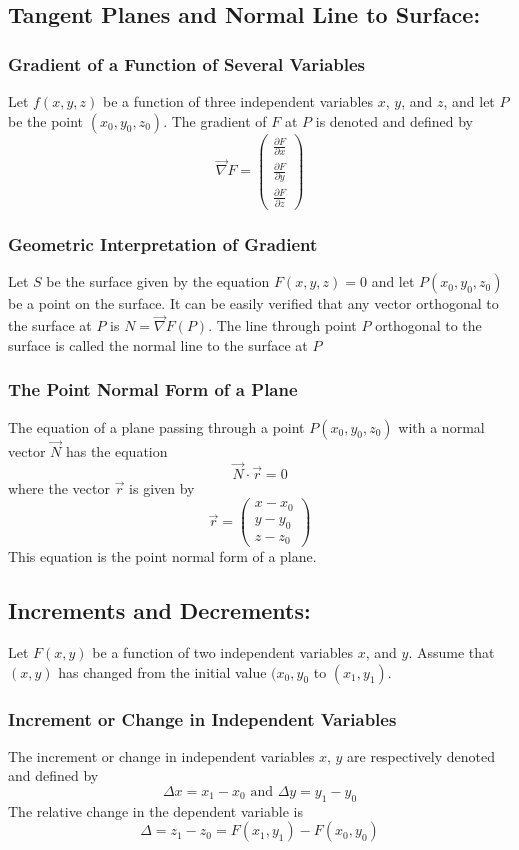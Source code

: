 \documentclass[14pt]{article}
\begin{document}
    \subsection{Tangent Planes and Normal Line to Surface:}
    \subsubsection{Gradient of a Function of Several Variables}
    Let $f(x,y,z)$ be a function of three independent variables $x$, $y$, and $z$, and let $P$ be the point $(x_0, y_0, z_0)$. The gradient of $F$ at $P$ is denoted and defined by
    $$\vec\nabla F=\begin{pmatrix}
        \frac{\partial F}{\partial x}\\
        \frac{\partial F}{\partial y}\\
        \frac{\partial F}{\partial z}
    \end{pmatrix}$$
    \subsubsection{Geometric Interpretation of Gradient}
    Let $S$ be the surface given by the equation $F(x,y,z)=0$ and let $P(x_0, y_0, z_0)$ be a point on the surface. It can be easily verified that any vector orthogonal to the surface at $P$ is $N=\vec \nabla F(P)$. The line through point $P$ orthogonal to the surface is called the normal line to the surface at $P$
    \subsubsection{The Point Normal Form of a Plane}
    The equation of  a plane passing through a point $P(x_0, y_0, z_0)$ with a normal vector $\vec N$ has the equation
    $$\vec N\cdot \vec r=0$$
    where the vector $\vec r$ is given by
    $$\vec r=\begin{pmatrix}
        x-x_0\\
        y-y_0\\
        z-z_0
    \end{pmatrix}$$
    This equation is the point normal form of a plane.
    \subsection{Increments and Decrements:}
    Let $F(x,y)$ be a function of two independent variables $x$, and $y$. Assume that $(x,y)$ has changed from the initial value $(x_0, y_0$ to $(x_1, y_1)$. 
    \subsubsection{Increment or Change in Independent Variables}
    The increment or change in independent variables $x$, $y$ are respectively denoted and defined by
    $$\Delta x=x_1-x_0\text{ and }\Delta y=y_1-y_0$$
    The relative change in the dependent variable is
    $$\Delta=z_1-z_0=F(x_1, y_1)-F(x_0, y_0)$$
\end{document}

